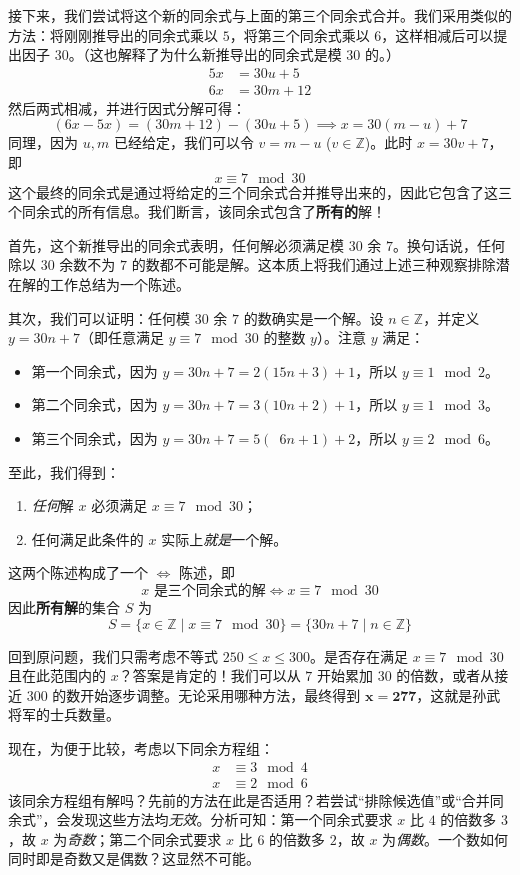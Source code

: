 接下来，我们尝试将这个新的同余式与上面的第三个同余式合并。我们采用类似的方法：将刚刚推导出的同余式乘以 $5$，将第三个同余式乘以 $6$，这样相减后可以提出因子 $30$。（这也解释了为什么新推导出的同余式是模 $30$ 的。）
\begin{align*}
    5x &= 30u + 5 \\
    6x &= 30m + 12
\end{align*}
然后两式相减，并进行因式分解可得：
\[(6x - 5x) = (30m + 12) - (30u + 5) \implies x = 30(m - u) + 7\]
同理，因为 $u,m$ 已经给定，我们可以令 $v = m-u$ ($v \in \mathbb{Z}$)。此时 $x = 30v+7$，即
\[x \equiv 7 \mod 30\]
这个最终的同余式是通过将给定的三个同余式合并推导出来的，因此它包含了这三个同余式的所有信息。我们断言，该同余式包含了\textbf{所有的}解！

首先，这个新推导出的同余式表明，任何解必须满足模 $30$ 余 $7$。换句话说，任何除以 $30$ 余数不为 $7$ 的数都不可能是解。这本质上将我们通过上述三种观察排除潜在解的工作总结为一个陈述。

其次，我们可以证明：任何模 $30$ 余 $7$ 的数确实是一个解。设 $n \in \mathbb{Z}$，并定义 $y = 30n + 7$（即任意满足 $y \equiv 7 \mod 30$ 的整数 $y$）。注意 $y$ 满足：
\begin{itemize}
    \item 第一个同余式，因为 $y = 30n + 7 = 2(15n + 3) + 1$，所以 $y \equiv 1 \mod 2$。
    \item 第二个同余式，因为 $y = 30n + 7 = 3(10n + 2) + 1$，所以 $y \equiv 1 \mod 3$。
    \item 第三个同余式，因为 $y = 30n + 7 = 5(\enspace 6n + 1) + 2$，所以 $y \equiv 2 \mod 6$。
\end{itemize}
至此，我们得到：
\begin{enumerate}[label=(\arabic*)]
    \item \emph{任何}解 $x$ 必须满足 $x \equiv 7 \mod 30$；
    \item 任何满足此条件的 $x$ 实际上\emph{就是}一个解。
\end{enumerate}
这两个陈述构成了一个 $\iff$ 陈述，即
\[x \text{\ 是三个同余式的解} \iff x \equiv 7 \mod 30\]
因此\textbf{所有解}的集合 $S$ 为
\[S = \{x \in \mathbb{Z} \mid x \equiv 7 \mod 30\} = \{30n + 7 \mid n \in \mathbb{Z}\}\]

回到原问题，我们只需考虑不等式 $250 \le x \le 300$。是否存在满足 $x \equiv 7 \mod 30$ 且在此范围内的 $x$？答案是肯定的！我们可以从 $7$ 开始累加 $30$ 的倍数，或者从接近 $300$ 的数开始逐步调整。无论采用哪种方法，最终得到 $\mathbf{x = 277}$，这就是孙武将军的士兵数量。

现在，为便于比较，考虑以下同余方程组：
\begin{align*}
    x &\equiv 3 \mod 4 \\
    x &\equiv 2 \mod 6
\end{align*}
该同余方程组有解吗？先前的方法在此是否适用？若尝试``排除候选值''或``合并同余式''，会发现这些方法均\emph{无效}。分析可知：第一个同余式要求 $x$ 比 $4$ 的倍数多 $3$，故 $x$ 为\emph{奇数}；第二个同余式要求 $x$ 比 $6$ 的倍数多 $2$，故 $x$ 为\emph{偶数}。一个数如何同时即是奇数又是偶数？这显然不可能。

